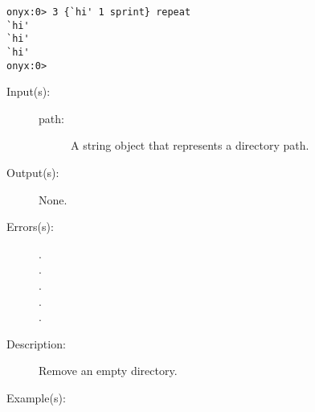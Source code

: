 \begin{description}
\begin{description}
\begin{verbatim}
onyx:0> 3 {`hi' 1 sprint} repeat
`hi'
`hi'
`hi'
onyx:0>
		\end{verbatim}
	\end{description}
\label{systemdict:rmdir}
\item[{\onyxop{path}{rmdir}{--}}: ]
	\begin{description}\item[]
	\item[Input(s): ]
		\begin{description}\item[]
		\item[path: ]
			A string object that represents a directory path.
		\end{description}
	\item[Output(s): ] None.
	\item[Errors(s): ]
		\begin{description}\item[]
		\item[.]
		\item[.]
		\item[.]
		\item[.]
		\item[.]
		\end{description}
	\item[Description: ]
		Remove an empty directory.
	\item[Example(s): ]\begin{verbatim}


\end{verbatim}
\end{description}
\end{description}
